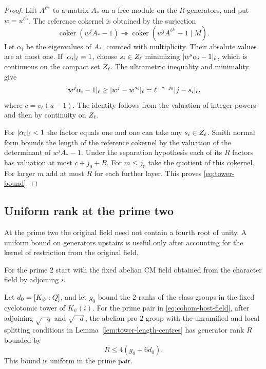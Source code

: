 \begin{proof}
Lift \(A^{\ell^{j_0}}\) to a matrix \(A_*\) on a free module on
the \(R\) generators, and put \(w=u^{\ell^{j_0}}\).
The reference cokernel is obtained by the surjection
\[
 \operatorname{coker}(w^j A_*-1)\twoheadrightarrow \operatorname{coker}(w^j A^{\ell^{j_0}}-1\mid M).
\]
 Let \(\alpha_i\) be the eigenvalues of \(A_*\),
counted with multiplicity. Their absolute values are at most one.
If \(\lvert\alpha_i\rvert_\ell=1\), choose \(s_i\in Z_\ell\) minimizing
\(\lvert w^s\alpha_i-1\rvert_\ell\), which is continuous on the compact
set \(Z_\ell\). The ultrametric inequality and minimality give
\[
   \lvert w^j\alpha_i-1\rvert_\ell\ge
      \lvert w^j-w^{s_i}\rvert_\ell
      =\ell^{-c-j_0}\lvert j-s_i\rvert_\ell ,
\]
where \(c=v_\ell(u-1)\). The identity follows from the valuation of
integer powers and then by continuity on \(Z_\ell\).

For \(\lvert\alpha_i\rvert_\ell<1\) the factor equals one and one can
take any \(s_i\in Z_\ell\).
Smith normal form bounds the length of the reference cokernel by
the valuation of the determinant of \(w^j A_*-1\). Under the
separation hypothesis each of its \(R\) factors has valuation at most
\(c+j_0+B\). For \(m\le j_0\) take the quotient of this cokernel.
For larger \(m\) add at most \(R\) for each further layer. This proves
\eqref{eq:tower-bound}.
\end{proof}

\subsection{Uniform rank at the prime two}

At the prime two the original field need not contain a fourth root of unity. A uniform bound on generators upstairs is useful only after accounting for the kernel of restriction from the original field.

For the prime \(2\) start with the fixed abelian CM field obtained
from the character field by adjoining \(i\).
\begin{lemma}\label{lem:dyadic-generators}
Let \(d_0=[K_\psi:Q]\), and let \(g_0\) bound the \(2\)-ranks of the
class groups in the fixed cyclotomic tower of \(K_\psi(i)\).
For the prime pair in \eqref{eq:cohom-host-field}, after adjoining
\(\sqrt{-q}\) and \(\sqrt{-d}\), the abelian
pro-\(2\) group with the unramified and local splitting conditions
in Lemma~\ref{lem:tower-length-centres} has generator rank \(R\) bounded by 
\[
 R\le4(g_0+6d_0).
\]
 This bound is uniform in the prime pair.
\end{lemma}

